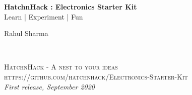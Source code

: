 
\begingroup
\thispagestyle{empty}
\centering
\vspace*{5cm}
\par\normalfont\fontsize{35}{35}\sffamily\selectfont
\textbf{HatchnHack : Electronics Starter Kit}\\
{\LARGE Learn | Experiment | Fun}\par %
\vspace*{1cm}
{\Huge Rahul Sharma}\par %
\endgroup


\newpage
~\vfill
\thispagestyle{empty}


\noindent \textsc{HatchnHack - A nest to your ideas}\\

\noindent \textsc{https://github.com/hatchnhack/Electronics-Starter-Kit}\\ %

\noindent \textit{First release, September 2020} %